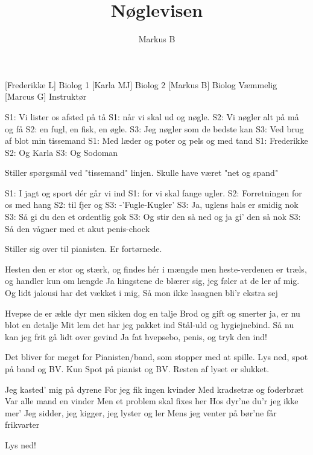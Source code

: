 \documentclass[a4paper,11pt]{article}
\title{Nøglevisen}
\author{Markus B}
\begin{document}
\maketitle

\begin{roles}
[Frederikke L] Biolog 1
[Karla MJ] Biolog 2
[Markus B] Biolog Væmmelig
[Marcus G] Instruktør
\end{roles}

\begin{song}


S1: Vi lister os afsted på tå 
S1: når vi skal ud og nøgle.
S2: Vi nøgler alt på må og få
S2: en fugl, en fisk, en øgle.
S3: Jeg nøgler som de bedste kan
S3: Ved brug af blot min tissemand 
S1: Med læder og poter og pels og med tand
S1: Frederikke S2: Og Karla S3: Og Sodoman 

 Stiller spørgsmål ved "tissemand" linjen. Skulle have været "net og spand" 

S1: I jagt og sport dér går vi ind 
S1: for vi skal fange ugler.
S2: Forretningen for os med hang 
S2: til fjer og 
S3: -'Fugle-Kugler'
S3: Ja, uglens hals er smidig nok
S3: Så gi du den et ordentlig gok
S3: Og stir den så ned og ja gi' den så nok
S3: Så den vågner med et akut penis-chock

 Stiller sig over til pianisten. Er fortørnede.

Hesten den er stor og stærk, 
og findes hér i mængde
men heste-verdenen er træls, 
og handler kun om længde
Ja hingstene de blærer sig, 
jeg føler at de ler af mig.
Og lidt jalousi har det vækket i mig,
Så mon ikke lasagnen bli'r ekstra sej

Hvepse de er ækle dyr 
men sikken dog en talje
Brod og gift og smerter ja, 
er nu blot en detalje
Mit lem det har jeg pakket ind
Stål-uld og hygiejnebind.
Så nu kan jeg frit gå lidt over gevind
Ja fat hvepsebo, penis, og tryk den ind!

\scene Det bliver for meget for Pianisten/band, som stopper med at spille.
\scene Lys ned, spot på band og BV.
\scene Kun Spot på pianist og BV. Resten af lyset er slukket.

Jeg kasted' mig på dyrene 
For jeg fik ingen kvinder
Med kradsetræ og foderbræt 
Var alle mand en vinder
Men et problem skal fixes her
Hos dyr'ne du'r jeg ikke mer'
Jeg sidder, jeg kigger, jeg lyster og ler
Mens jeg venter på bør'ne får frikvarter

\scene Lys ned!

\end{song}
\end{document}
